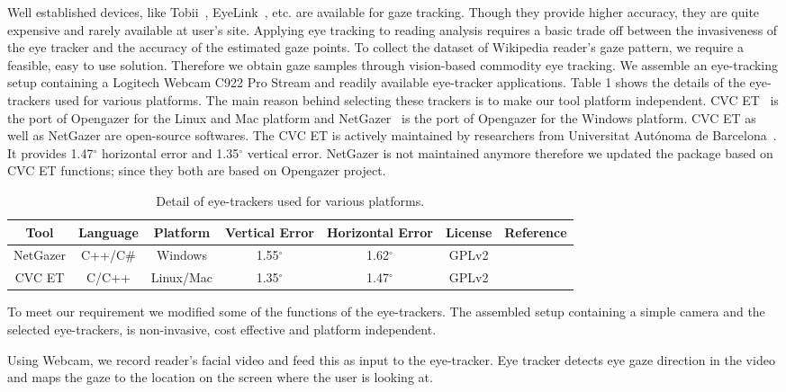 \documentclass[12pt]{article}
\begin{document}
Well established devices, like Tobii~\cite{olsen2012tobii}, EyeLink~\cite{cornelissen2002eyelink}, etc. are available for gaze tracking. Though they provide higher accuracy, they are quite expensive and rarely available at user's site. Applying eye tracking to reading analysis requires a basic trade off between the invasiveness of the eye tracker and the accuracy of the estimated gaze points. To collect the dataset of Wikipedia reader's gaze pattern, we require a feasible, easy to use solution. 
Therefore we obtain gaze samples through vision-based commodity eye tracking. We assemble an eye-tracking setup containing a Logitech Webcam C922 Pro Stream and readily available eye-tracker applications. Table 1 shows the details of the eye-trackers used for various platforms. 
The main reason behind selecting these trackers is to make our tool platform independent. CVC ET~\cite{ferhat2014cheap, CVC} is the port of Opengazer for the Linux and Mac platform and NetGazer~\cite{WinNT} is the port of Opengazer for the Windows platform. CVC ET as well as NetGazer are open-source softwares. The CVC ET is actively maintained by researchers from Universitat Aut\'{o}noma de Barcelona~\cite{CVC}. It provides 1.47$^{\circ}$ horizontal error and 1.35$^{\circ}$ vertical error. NetGazer is not maintained anymore therefore we updated the package based on CVC ET functions; since they both are based on Opengazer project. 

\begin{table}[]
\begin{tabular}{|c|c|c|c|c|c|c|}
\hline
Tool     & Language & Platform  & Vertical Error & Horizontal Error & License & Reference                     \\ \hline
NetGazer & C++/C\#  & Windows   & 1.55$^{\circ}$ & 1.62$^{\circ}$   & GPLv2   & \cite{WinNT} \\ \hline
CVC ET   & C/C++    & Linux/Mac & 1.35$^{\circ}$ & 1.47$^{\circ}$   & GPLv2   & \cite{CVC}   \\ \hline
\end{tabular}
\caption{Detail of eye-trackers used for various platforms.}
\label{tab:eye_tracker}
\end{table}

To meet our requirement we modified some of the functions of the eye-trackers. The assembled setup containing a simple camera and the selected eye-trackers, is non-invasive, cost effective and platform independent. 


Using Webcam, we record reader's facial video and feed this as input to the eye-tracker. Eye tracker detects eye gaze direction in the video and maps the gaze to the location on the screen where the user is looking at. 
\end{document}
